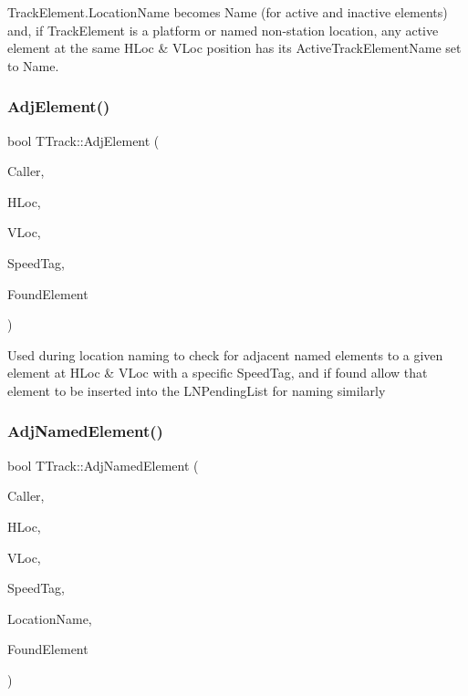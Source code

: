 Track\+Element.\+Location\+Name becomes \textquotesingle{}Name\textquotesingle{} (for active and inactive elements) and, if Track\+Element is a platform or named non-\/station location, any active element at the same H\+Loc \& V\+Loc position has its Active\+Track\+Element\+Name set to \textquotesingle{}Name\textquotesingle{}. \mbox{\label{class_t_track_a607c6164af3158c328dd7c3ae25236c7}} 
\subsubsection{\texorpdfstring{Adj\+Element()}{AdjElement()}}
{\footnotesize\ttfamily bool T\+Track\+::\+Adj\+Element (\begin{DoxyParamCaption}\item[{int}]{Caller,  }\item[{int}]{H\+Loc,  }\item[{int}]{V\+Loc,  }\item[{int}]{Speed\+Tag,  }\item[{int \&}]{Found\+Element }\end{DoxyParamCaption})}

Used during location naming to check for adjacent named elements to a given element at H\+Loc \& V\+Loc with a specific Speed\+Tag, and if found allow that element to be inserted into the L\+N\+Pending\+List for naming similarly \mbox{\label{class_t_track_a96a3a6bcd38491f4f00ec2a585c6f170}} 
\subsubsection{\texorpdfstring{Adj\+Named\+Element()}{AdjNamedElement()}}
{\footnotesize\ttfamily bool T\+Track\+::\+Adj\+Named\+Element (\begin{DoxyParamCaption}\item[{int}]{Caller,  }\item[{int}]{H\+Loc,  }\item[{int}]{V\+Loc,  }\item[{int}]{Speed\+Tag,  }\item[{Ansi\+String \&}]{Location\+Name,  }\item[{int \&}]{Found\+Element }\end{DoxyParamCaption})}


